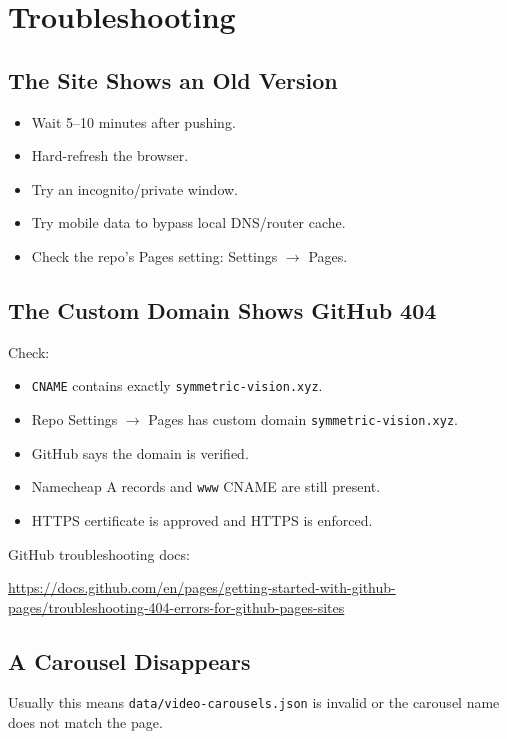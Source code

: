 \documentclass[11pt]{article}
\begin{document}
\section{Troubleshooting}

\subsection{The Site Shows an Old Version}

\begin{itemize}
  \item Wait 5--10 minutes after pushing.
  \item Hard-refresh the browser.
  \item Try an incognito/private window.
  \item Try mobile data to bypass local DNS/router cache.
  \item Check the repo's Pages setting: Settings \(\rightarrow\) Pages.
\end{itemize}

\subsection{The Custom Domain Shows GitHub 404}

Check:

\begin{itemize}
  \item \texttt{CNAME} contains exactly \texttt{symmetric-vision.xyz}.
  \item Repo Settings \(\rightarrow\) Pages has custom domain \texttt{symmetric-vision.xyz}.
  \item GitHub says the domain is verified.
  \item Namecheap A records and \texttt{www} CNAME are still present.
  \item HTTPS certificate is approved and HTTPS is enforced.
\end{itemize}

GitHub troubleshooting docs:

\url{https://docs.github.com/en/pages/getting-started-with-github-pages/troubleshooting-404-errors-for-github-pages-sites}

\subsection{A Carousel Disappears}

Usually this means \texttt{data/video-carousels.json} is invalid or the carousel name does not match the page.
\end{document}
